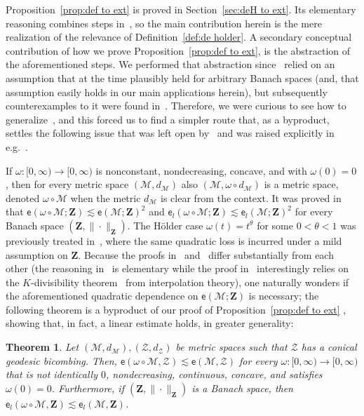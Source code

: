 \documentclass[11pt,reqno]{amsart}
\newtheorem{theorem}{Theorem}
\newcommand{\ee}{\mathsf{e}}
\newcommand{\cZ}{\mathcal{Z}}
\newcommand{\MM}{\mathcal{M}}
\newcommand{\bZ}{\mathbf{Z}}
\begin{document}
Proposition~\ref{prop:def to ext} is proved in Section~\ref{sec:deH to ext}. Its elementary reasoning combines steps  in~\cite{Nao01,LN05,Nao24}, so the main contribution herein is the mere realization of the relevance of Definition~\ref{def:de holder}. A secondary conceptual contribution of how we prove Proposition~\ref{prop:def to ext},  is the abstraction of the aforementioned steps.  We performed that abstraction since~\cite{Nao01} relied on an assumption that at the time plausibly held for arbitrary Banach spaces (and, that assumption easily holds in our main applications herein), but subsequently counterexamples to it were found in~\cite{Kal11,Acu26}. Therefore, we were curious to see how to generalize~\cite{Nao01}, and this forced us to find a simpler route that, as a byproduct, settles the following  issue that was left open by~\cite{BS02} and was raised explicitly in e.g.~\cite[Remark~141]{Nao24}.  


If $\omega:[0,\infty)\to [0,\infty)$ is nonconstant, nondecreasing, concave, and with $\omega(0)=0$, then for every metric space $(\MM,d_\MM)$ also $(\MM,\omega\circ d_\MM)$ is a metric space,  denoted $\omega\circ \MM$ when the metric $d_\MM$ is clear from the context. It was proved in~\cite{BS02} that $\ee(\omega\circ \MM;\bZ)\lesssim \ee(\MM;\bZ)^2$ and $\ee_l(\omega\circ \MM;\bZ)\lesssim \ee_l(\MM;\bZ)^2$ for every Banach space $(\bZ,\|\cdot\|_\bZ)$. The H\"older case $\omega(t)=t^\theta$ for some $0<\theta<1$ was previously treated in~\cite{Nao01}, where the same quadratic loss is incurred under a mild assumption on $\bZ$. Because the proofs in~\cite{Nao01} and~\cite{BS02} differ substantially from each other  (the reasoning in~\cite{Nao01} is elementary while the proof in~\cite{BS02} interestingly relies on the $K$-divisibility theorem~\cite{BK91}  from interpolation theory), one naturally wonders if the aforementioned  quadratic dependence on $\ee(\MM;\bZ)$ is necessary; the following theorem is a byproduct of our proof of Proposition~\ref{prop:def to ext} , showing that, in fact, a linear estimate holds, in greater generality: 

\begin{theorem}\label{thm:linear BS} Let $(\MM,d_\MM), (\cZ,d_\cZ)$ be metric spaces such that $\cZ$ has a conical geodesic bicombing. Then, $\ee(\omega\circ \MM,\cZ)\lesssim \ee(\MM,\cZ)$ for every $\omega:[0,\infty)\to [0,\infty)$ that is not identically $0$, nondecreasing, continuous,  concave, and satisfies  $\omega(0)=0$. Furthermore, if  $(\bZ,\|\cdot\|_\bZ)$ is a Banach space, then  $\ee_l(\omega\circ \MM,\bZ)\lesssim \ee_l(\MM,\bZ)$.
\end{theorem}
\end{document}
